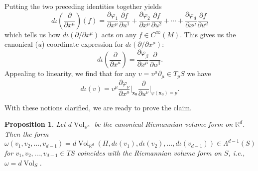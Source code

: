 \documentclass{article}
\newcommand{\p}{\partial}
\newcommand{\f}[2]{\frac{#1}{#2}}
\theoremstyle{theorem}
\newtheorem{proposition}[theorem]{Proposition}
\newcommand{\Vol}{\operatorname{Vol}}
\begin{document}
Putting the two preceding identities together yields
\begin{equation*}
d\iota\left(\frac{\partial}{\partial x^\mu}\right)(f) =\frac{\partial\varphi_1}{\partial x^{\mu}}\frac{\partial f}{\partial u^1}+\frac{\partial\varphi_2}{\partial x^{\mu}}\frac{\partial f}{\partial u^2}+\cdots+\frac{\partial\varphi_d}{\partial x^{\mu}}\frac{\partial f}{\partial u^d}
\end{equation*}
which tells us how $d\iota(\partial/\partial x^\mu)$ acts on any $f\in C^{\infty}(M)$. This gives us the canonical ($u$) coordinate expression for $d\iota(\partial/\partial x^{\mu})$:
\begin{equation*}
d\iota\left(\frac{\partial}{\partial x^{\mu}}\right)=\frac{\partial\varphi_\beta}{\partial x^{\mu}}\frac{\partial}{\partial u^\beta}.
\end{equation*}
Appealing to linearity, we find that for any $v = v^\mu \p_\mu \in T_p S$ we have
\begin{equation*}
d\iota(v)= v^\mu\f{\p \varphi_\nu}{\p x^\mu}\bigg\vert_{\mathbf{x_0}} \f{\p }{\p u^\nu}\bigg\vert_{\varphi(\mathbf{x_0}) = p}.
\end{equation*}

With these notions clarified, we are ready to prove the claim.
\begin{proposition}\label{prop:dVolsCoincide}
Let $d\Vol_{\mathbb{R}^d}$ be the canonical Riemannian volume form on $\mathbb{R}^d$. Then the form
\begin{equation*}
\omega(v_1,v_2,\dots,v_{d-1})=d\Vol_{\mathbb{R}^d}(\Pi,d\iota(v_1),d\iota(v_2),\dots,d\iota(v_{d-1})) \in \Lambda^{d-1}(S)
\end{equation*}
for $v_1,v_2,\dots,v_{d-1}\in TS$ coincides with the Riemannian volume form on $S$, i.e., $\omega=d\Vol_S$.
\end{proposition}
\end{document}
